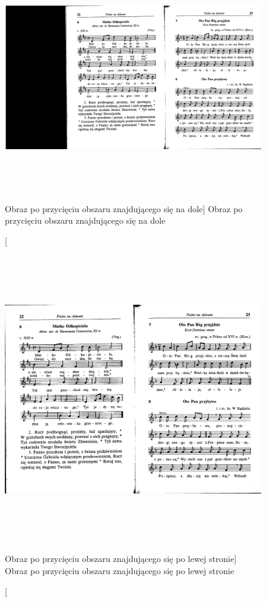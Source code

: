 \documentclass[a4paper,12pt]{article}
\begin{document}
    		    \begin{figure}[!ht]  
    			    \begin{center}
    				    \includegraphics[height=10cm, frame]{image//exampleImage//002_b.png} 
    			    \end{center}
    			    \caption
            			[Obraz po przycięciu obszaru znajdującego się na dole] 
        			    {Obraz po przycięciu obszaru znajdującego się na dole}  
    		    \end{figure}
    			
    	        \begin{figure}[!ht]  
    			    \begin{center}
    				    \includegraphics[height=12.5cm, frame] {image//exampleImage//002_c.png}
    			    \end{center}
        			\caption
        			    [Obraz po przycięciu obszaru znajdującego się po lewej stronie]
        			    {Obraz po przycięciu obszaru znajdującego się po lewej stronie} 
    		    \end{figure}
\end{document}
